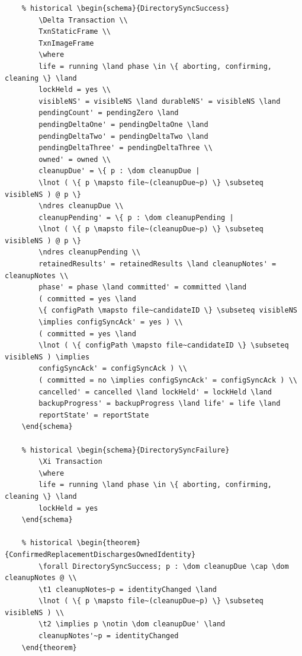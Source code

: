 \documentclass{article}
\makeatletter
\newenvironment{theorem}[1]{\medskip\noindent\textbf{Theorem (#1).}\@nameuse{zed}}{\@nameuse{endzed}}
\makeatother
\begin{document}
\begin{verbatim}
	% historical \begin{schema}{DirectorySyncSuccess}
		\Delta Transaction \\
		TxnStaticFrame \\
		TxnImageFrame
		\where
		life = running \land phase \in \{ aborting, confirming, cleaning \} \land
		lockHeld = yes \\
		visibleNS' = visibleNS \land durableNS' = visibleNS \land
		pendingCount' = pendingZero \land
		pendingDeltaOne' = pendingDeltaOne \land
		pendingDeltaTwo' = pendingDeltaTwo \land
		pendingDeltaThree' = pendingDeltaThree \\
		owned' = owned \\
		cleanupDue' = \{ p : \dom cleanupDue |
		\lnot ( \{ p \mapsto file~(cleanupDue~p) \} \subseteq visibleNS ) @ p \}
		\ndres cleanupDue \\
		cleanupPending' = \{ p : \dom cleanupPending |
		\lnot ( \{ p \mapsto file~(cleanupDue~p) \} \subseteq visibleNS ) @ p \}
		\ndres cleanupPending \\
		retainedResults' = retainedResults \land cleanupNotes' = cleanupNotes \\
		phase' = phase \land committed' = committed \land
		( committed = yes \land
		\{ configPath \mapsto file~candidateID \} \subseteq visibleNS
		\implies configSyncAck' = yes ) \\
		( committed = yes \land
		\lnot ( \{ configPath \mapsto file~candidateID \} \subseteq visibleNS ) \implies
		configSyncAck' = configSyncAck ) \\
		( committed = no \implies configSyncAck' = configSyncAck ) \\
		cancelled' = cancelled \land lockHeld' = lockHeld \land
		backupProgress' = backupProgress \land life' = life \land
		reportState' = reportState
	\end{schema}

	% historical \begin{schema}{DirectorySyncFailure}
		\Xi Transaction
		\where
		life = running \land phase \in \{ aborting, confirming, cleaning \} \land
		lockHeld = yes
	\end{schema}

	% historical \begin{theorem}{ConfirmedReplacementDischargesOwnedIdentity}
		\forall DirectorySyncSuccess; p : \dom cleanupDue \cap \dom cleanupNotes @ \\
		\t1 cleanupNotes~p = identityChanged \land
		\lnot ( \{ p \mapsto file~(cleanupDue~p) \} \subseteq visibleNS ) \\
		\t2 \implies p \notin \dom cleanupDue' \land
		cleanupNotes'~p = identityChanged
	\end{theorem}


\end{verbatim}
\end{document}
